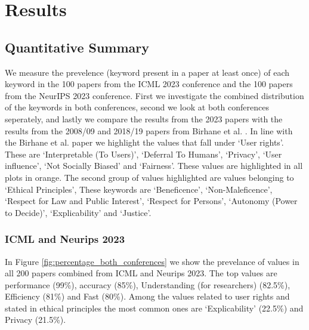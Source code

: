 \documentclass{article}
\begin{document}
\section{Results}
\subsection{Quantitative Summary}
We measure the prevelence (keyword present in a paper at least once) of each keyword in the 100 papers from the ICML 2023 conference and the 100 papers from the NeurIPS 2023 conference. First we investigate the combined distribution of the keywords in both conferences, second we look at both conferences seperately,
and lastly we compare the results from the 2023 papers with the results from the 2008/09 and 2018/19 papers from Birhane et al. \cite{valuesInML2021}. 
In line with the Birhane et al. paper we highlight the values that fall under `User rights'. These are `Interpretable (To Users)', `Deferral To Humans', `Privacy', `User influence', `Not Socially Biased' and `Fairness'. 
These values are highlighted in all plots in orange. The second group of values highlighted are values belonging to `Ethical Principles', These keywords are `Beneficence', `Non-Maleficence', `Respect for Law and Public Interest', 
`Respect for Persons', `Autonomy (Power to Decide)', `Explicability' and `Justice'.
\subsubsection{ICML and Neurips 2023}
In Figure \ref{fig:percentage_both_conferences} we show the prevelance of values in all 200 papers combined from ICML and Neurips 2023. The top values are performance (99\%), accuracy (85\%), 
Understanding (for researchers) (82.5\%), Efficiency (81\%) and Fast (80\%). Among the values related to user rights and stated in 
ethical principles the most common ones are `Explicability' (22.5\%) and Privacy (21.5\%). 
\end{document}
